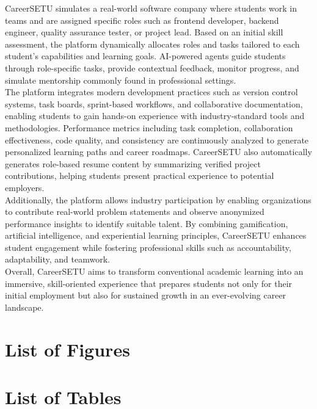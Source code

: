 \documentclass[12pt,a4paper]{report}
\begin{document}
CareerSETU simulates a real-world software company where students work in teams and are
assigned specific roles such as frontend developer, backend engineer, quality assurance
tester, or project lead. Based on an initial skill assessment, the platform dynamically
allocates roles and tasks tailored to each student's capabilities and learning goals.
AI-powered agents guide students through role-specific tasks, provide contextual feedback,
monitor progress, and simulate mentorship commonly found in professional settings.\\[0.1cm]

The platform integrates modern development practices such as version control systems,
task boards, sprint-based workflows, and collaborative documentation, enabling students
to gain hands-on experience with industry-standard tools and methodologies. Performance
metrics including task completion, collaboration effectiveness, code quality, and
consistency are continuously analyzed to generate personalized learning paths and career
roadmaps. CareerSETU also automatically generates role-based resume content by summarizing
verified project contributions, helping students present practical experience to potential
employers.\\[0.1cm]

Additionally, the platform allows industry participation by enabling organizations to
contribute real-world problem statements and observe anonymized performance insights to
identify suitable talent. By combining gamification, artificial intelligence, and
experiential learning principles, CareerSETU enhances student engagement while fostering
professional skills such as accountability, adaptability, and teamwork.\\[0.1cm]

Overall, CareerSETU aims to transform conventional academic learning into an immersive,
skill-oriented experience that prepares students not only for their initial employment
but also for sustained growth in an ever-evolving career landscape.

\chapter*{List of Figures}
\listoffigures
\newpage

\chapter*{List of Tables}
\listoftables
\newpage
\end{document}
